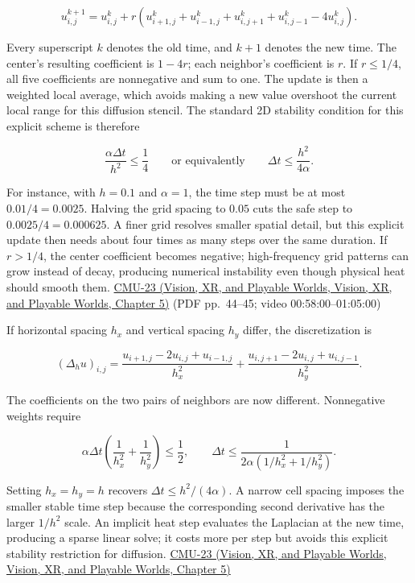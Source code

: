 \[
u_{i,j}^{k+1}=u_{i,j}^{k}+r\left(u_{i+1,j}^{k}+u_{i-1,j}^{k}+u_{i,j+1}^{k}+u_{i,j-1}^{k}-4u_{i,j}^{k}\right).
\]

Every superscript \(k\) denotes the old time, and \(k+1\) denotes the new time. The center's resulting coefficient is \(1-4r\); each neighbor's coefficient is \(r\). If \(r\le1/4\), all five coefficients are nonnegative and sum to one. The update is then a weighted local average, which avoids making a new value overshoot the current local range for this diffusion stencil. The standard 2D stability condition for this explicit scheme is therefore

\[
\frac{\alpha\Delta t}{h^2}\le\frac14
\qquad\text{or equivalently}\qquad
\Delta t\le\frac{h^2}{4\alpha}.
\]

For instance, with \(h=0.1\) and \(\alpha=1\), the time step must be at most \(0.01/4=0.0025\). Halving the grid spacing to \(0.05\) cuts the safe step to \(0.0025/4=0.000625\). A finer grid resolves smaller spatial detail, but this explicit update then needs about four times as many steps over the same duration. If \(r>1/4\), the center coefficient becomes negative; high-frequency grid patterns can grow instead of decay, producing numerical instability even though physical heat should smooth them. \href{../07-Vision-XR-and-Playable-Worlds/main.pdf\#nameddest=04-visual-computing-ii-ch036-cmu-23---physically-based-animation-and-pdes}{CMU-23 (Vision, XR, and Playable Worlds, Vision, XR, and Playable Worlds, Chapter 5)} (PDF pp.~44--45; video 00:58:00--01:05:00)

If horizontal spacing \(h_x\) and vertical spacing \(h_y\) differ, the discretization is

\[
(\Delta_hu)_{i,j}=
\frac{u_{i+1,j}-2u_{i,j}+u_{i-1,j}}{h_x^2}
+\frac{u_{i,j+1}-2u_{i,j}+u_{i,j-1}}{h_y^2}.
\]

The coefficients on the two pairs of neighbors are now different. Nonnegative weights require

\[
\alpha\Delta t\left(\frac{1}{h_x^2}+\frac{1}{h_y^2}\right)\le\frac12,
\qquad
\Delta t\le\frac{1}{2\alpha(1/h_x^2+1/h_y^2)}.
\]

Setting \(h_x=h_y=h\) recovers \(\Delta t\le h^2/(4\alpha)\). A narrow cell spacing imposes the smaller stable time step because the corresponding second derivative has the larger \(1/h^2\) scale. An implicit heat step evaluates the Laplacian at the new time, producing a sparse linear solve; it costs more per step but avoids this explicit stability restriction for diffusion. \href{../07-Vision-XR-and-Playable-Worlds/main.pdf\#nameddest=04-visual-computing-ii-ch036-cmu-23---physically-based-animation-and-pdes}{CMU-23 (Vision, XR, and Playable Worlds, Vision, XR, and Playable Worlds, Chapter 5)}

